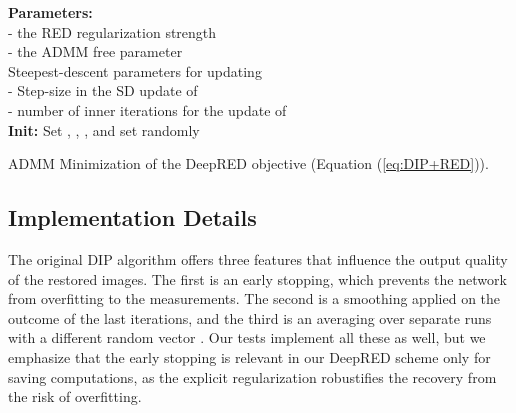 \documentclass[12pt]{article}
\begin{document}
\begin{algorithm}[!htb]

\SetAlgoLined
{}
{\bf Parameters:} \\
\hspace{0.2in}   - the RED regularization strength\\
\hspace{0.2in}   - the ADMM free parameter \\
\hspace{0.2in}  Steepest-descent parameters for updating \\
\hspace{0.2in}   - Step-size in the SD update of \\
\hspace{0.2in}   - number of inner iterations for the update of \\

{\bf Init:} Set , , , and set  randomly\\ 
\caption{ADMM Minimization of the DeepRED objective (Equation (\ref{eq:DIP+RED})).\label{Algorithm1}}
\end{algorithm}



\subsection{Implementation Details}

The original DIP algorithm \cite{DIP-2018} offers three features that influence the output quality of the restored images. The first is an early stopping, which prevents the network from overfitting to the measurements. The second is a smoothing applied on the outcome of the last iterations, and the third is an averaging over separate runs with a different random vector . Our tests implement all these as well, but we emphasize that the early stopping is relevant in our DeepRED scheme only for saving computations, as the explicit regularization robustifies the recovery from the risk of overfitting. 
\end{document}
